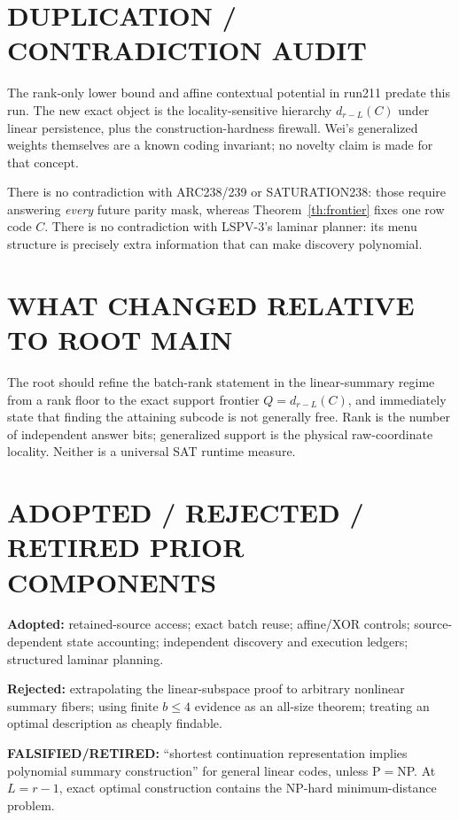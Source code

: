 \documentclass[11pt]{article}
\begin{document}
\section{DUPLICATION / CONTRADICTION AUDIT}

The rank-only lower bound and affine contextual potential in run211 predate this run.  The new exact object is the locality-sensitive hierarchy $d_{r-L}(C)$ under linear persistence, plus the construction-hardness firewall.  Wei's generalized weights themselves are a known coding invariant; no novelty claim is made for that concept.

There is no contradiction with ARC238/239 or SATURATION238: those require answering \emph{every} future parity mask, whereas Theorem~\ref{th:frontier} fixes one row code $C$.  There is no contradiction with LSPV-3's laminar planner: its menu structure is precisely extra information that can make discovery polynomial.

\section{WHAT CHANGED RELATIVE TO ROOT MAIN}

The root should refine the batch-rank statement in the linear-summary regime from a rank floor to the exact support frontier $Q=d_{r-L}(C)$, and immediately state that finding the attaining subcode is not generally free.  Rank is the number of independent answer bits; generalized support is the physical raw-coordinate locality.  Neither is a universal SAT runtime measure.

\section{ADOPTED / REJECTED / RETIRED PRIOR COMPONENTS}

\textbf{Adopted:} retained-source access; exact batch reuse; affine/XOR controls; source-dependent state accounting; independent discovery and execution ledgers; structured laminar planning.

\textbf{Rejected:} extrapolating the linear-subspace proof to arbitrary nonlinear summary fibers; using finite $b\le4$ evidence as an all-size theorem; treating an optimal description as cheaply findable.

\textbf{FALSIFIED/RETIRED:} ``shortest continuation representation implies polynomial summary construction'' for general linear codes, unless P$=$NP.  At $L=r-1$, exact optimal construction contains the NP-hard minimum-distance problem.
\end{document}
